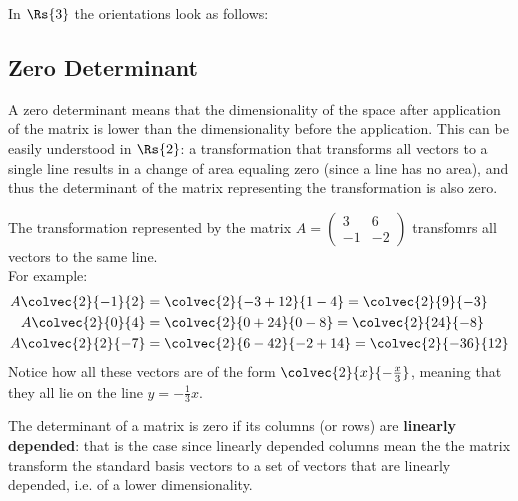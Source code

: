 In $\Rs{3}$ the orientations look as follows:
\begin{figure}[H]
  \centering
\end{figure}

\subsection{Zero Determinant}
A zero determinant means that the dimensionality of the space after application of the matrix is lower than the dimensionality before the application. This can be easily understood in $\Rs{2}$: a transformation that transforms all vectors to a single line results in a change of area equaling zero (since a line has no area), and thus the determinant of the matrix representing the transformation is also zero.
\begin{example}
  The transformation represented by the matrix $A=\begin{pmatrix}3&6\\-1&-2\end{pmatrix}$ transfomrs all vectors to the same line.\\ 
  For example:
  \begin{align*}
	A\colvec{2}{-1}{2} &= \colvec{2}{-3+12}{1-4} = \colvec{2}{9}{-3}\\
	A\colvec{2}{0}{4} &= \colvec{2}{0+24}{0-8} = \colvec{2}{24}{-8}\\
	A\colvec{2}{2}{-7} &= \colvec{2}{6-42}{-2+14} = \colvec{2}{-36}{12}
  \end{align*}
  Notice how all these vectors are of the form $\colvec{2}{x}{-\frac{x}{3}}$, meaning that they all lie on the line $y=-\frac{1}{3}x$.
\end{example}

The determinant of a matrix is zero if its columns (or rows) are \textbf{linearly depended}: that is the case since linearly depended columns mean the the matrix transform the standard basis vectors to a set of vectors that are linearly depended, i.e. of a lower dimensionality.

